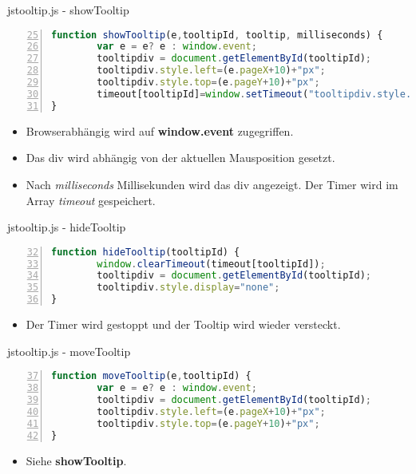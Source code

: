 \begin{frame}[<+->][fragile]{jstooltip.js - showTooltip}
\tiny{\begin{lstlisting}[language=JavaScript, 
		   numbers=left,
		   numbersep=3pt,
		   breaklines=true,
		   firstnumber=25]		 
function showTooltip(e,tooltipId, tooltip, milliseconds) {
        var e = e? e : window.event;
        tooltipdiv = document.getElementById(tooltipId);
        tooltipdiv.style.left=(e.pageX+10)+"px";
        tooltipdiv.style.top=(e.pageY+10)+"px";
        timeout[tooltipId]=window.setTimeout("tooltipdiv.style.display=\"block\"", milliseconds);
}		   
\end{lstlisting}}
\pause
\normalsize
\begin{itemize}
\item Browserabhängig wird auf \textbf{window.event} zugegriffen.
\item Das div wird abhängig von der aktuellen Mausposition gesetzt.
\item Nach \textit{milliseconds} Millisekunden wird das div angezeigt. Der Timer wird im Array \textit{timeout} gespeichert.
\end{itemize}

\end{frame}
\begin{frame}[<+->][fragile]{jstooltip.js - hideTooltip}
\tiny{\begin{lstlisting}[language=JavaScript, 
		   numbers=left,
		   numbersep=3pt,
		   breaklines=true,
		   firstnumber=32]		 
function hideTooltip(tooltipId) {
        window.clearTimeout(timeout[tooltipId]);
        tooltipdiv = document.getElementById(tooltipId);
        tooltipdiv.style.display="none";
}
\end{lstlisting}}
\pause
\normalsize
\begin{itemize}
\item Der Timer wird gestoppt und der Tooltip wird wieder versteckt.
\end{itemize}
\end{frame}
\begin{frame}[<+->][fragile]{jstooltip.js - moveTooltip}
\tiny{\begin{lstlisting}[language=JavaScript, 
		   numbers=left,
		   numbersep=3pt,
		   breaklines=true,
		   firstnumber=37]		 
function moveTooltip(e,tooltipId) {
        var e = e? e : window.event;
        tooltipdiv = document.getElementById(tooltipId);
        tooltipdiv.style.left=(e.pageX+10)+"px";
        tooltipdiv.style.top=(e.pageY+10)+"px";
}
\end{lstlisting}}
\normalsize
\pause
\begin{itemize}
\item Siehe \textbf{showTooltip}.
\end{itemize}
\end{frame}
